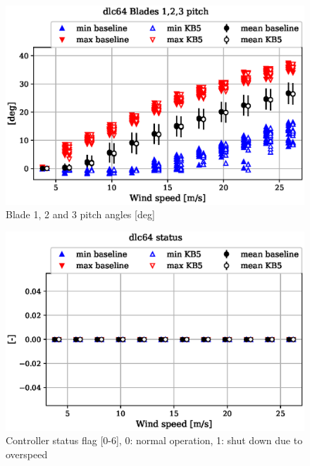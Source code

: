 \begin{figure}[!ht]
\begin{center}
	\includegraphics[width=.85\linewidth]{figures/baseline-vs-KB6/dlc64/bearing-pitch1-angle-deg_AA0008_AA0008.eps}
\end{center}
\caption{Blade 1, 2 and 3 pitch angles [deg]}
\label{fig:baseline-vs-KB6:dlc64:pitch}
\end{figure}

\begin{figure}[!ht]
\begin{center}
	\includegraphics[width=.85\linewidth]{figures/baseline-vs-KB6/dlc64/DLL-dtu_we_controller-inpvec-22_AA0008_AA0008.eps}
\end{center}
\caption{Controller status flag [0-6], 0: normal operation, 1: shut down due to overspeed}
\label{fig:baseline-vs-KB6:dlc64:status}
\end{figure}

